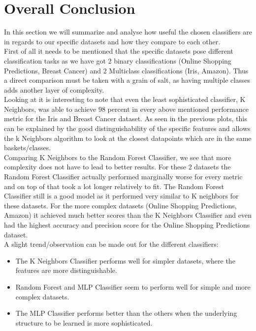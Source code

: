 \section{Overall Conclusion}
In this section we will summarize and analyse how useful the chosen classifiers are in regards to our specific datasets and how they compare to each other. \\
\newline
First of all it needs to be mentioned that the specific datasets pose different classification tasks as we have got 2 binary classifications (Online Shopping Predictions, Breast Cancer) and 2 Multiclass classifications (Iris, Amazon). Thus a direct comparison must be taken with a grain of salt, as having multiple classes adds another layer of complexity. \\
\newline
Looking at  it is interesting to note that even the least sophisticated classifier, K Neighbors, was able to achieve 98 percent in every above mentioned performance metric for the Iris and Breast Cancer dataset. As seen in the previous plots, this can be explained by the good distinguishability of the specific features and allows the k Neighbors algorithm to look at the closest datapoints which are in the same baskets/classes. \\
Comparing K Neighbors  to the Random Forest Classifier, we see that more complexity does not have to lead to better results. For these 2 datasets the Random Forest Classifier actually performed marginally worse for every metric and on top of that took a lot longer relatively to fit. The Random Forest Classifier still is a good model as it performed very similar to K neighbors for these datasets. For the more complex datasets (Online Shopping Predictions, Amazon) it achieved much better scores than the K Neighbors Classifier and even had the highest accuracy and precision score for the Online Shopping Predictions dataset. \\
\newline
A slight trend/observation can be made out for the different classifiers: 
\begin{itemize}
    \item The K Neighbors Classifier performs well for simpler datasets, where the features are more distinguishable.
    \item Random Forest and MLP Classifier seem to perform well for simple and more complex datasets.
    \item The MLP Classifier performs better than the others when the underlying structure to be learned is more sophisticated.
\end{itemize} 

